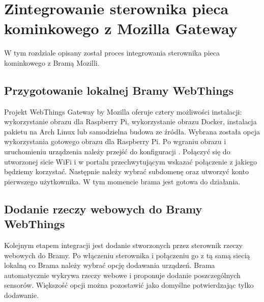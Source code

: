 \documentclass[11pt]{report}
\begin{document}
 \chapter{Zintegrowanie sterownika pieca kominkowego z Mozilla Gateway}\label{ch:gateway}
 W tym rozdziale opisany został proces integrowania sterownika pieca kominkowego z Bramą Mozilli.
 
 \section{Przygotowanie lokalnej Bramy WebThings}
  Projekt WebThings Gateway by Mozilla oferuje cztery możliwości instalacji: wykorzystanie obrazu dla Raspberry Pi, wykorzystanie obrazu Docker, instalacja pakietu na Arch Linux lub samodzielna budowa ze źródła. Wybrana została opcja wykorzystania gotowego obrazu dla Raspberry Pi.
  Po wgraniu obrazu i uruchomieniu urządzenia należy przejść do konfiguracji \cite{gatewaystarted2019}. Połączyć się do utworzonej sicie WiFi i w portalu przechwytującym wskazać połączenie z jakiego będziemy korzystać. Następnie należy wybrać subdomenę oraz utworzyć konto pierwszego użytkownika. W tym momencie brama jest gotowa do działania.

 \section{Dodanie rzeczy webowych do Bramy WebThings}
 Kolejnym etapem integracji jest dodanie stworzonych przez sterownik rzeczy webowych do Bramy. Po włączeniu sterownika i połączeniu go z tą samą siecią lokalną co Brama należy wybrać opcję dodawania urządzeń. Brama automatycznie wykrywa rzeczy webowe i proponuje dodanie poszczególnych sensorów. Większość opcji można pozostawić jako domyślne potwierdzając tylko dodawanie.
 
\end{document}
